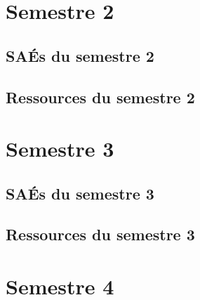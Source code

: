 \documentclass[10pt,french]{article} %
\begin{document}
\section{Semestre 2}

\subsection{SAÉs du semestre 2}


\subsection{Ressources du semestre 2}


%
%
%
%
%
\newpage


\section{Semestre 3}

\subsection{SAÉs du semestre 3}

%
\subsection{Ressources du semestre 3}


\newpage


\section{Semestre 4}
\def\sem{D} %
\end{document}

